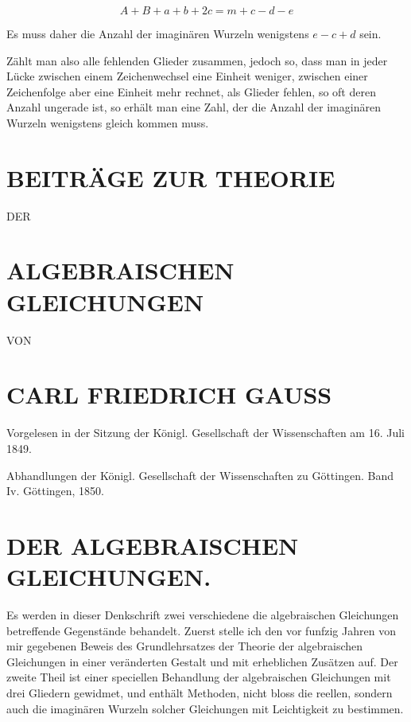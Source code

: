 \documentclass[twoside,12pt, showframe]{memoir}
\begin{document}
\[
A+B+a+b+2 c=m+c-d-e
\]

Es muss daher die Anzahl der imaginären Wurzeln wenigstens \(e-c+d\) sein.

Zählt man also alle fehlenden Glieder zusammen, jedoch so, dass man in jeder Lücke zwischen einem Zeichenwechsel eine Einheit weniger, zwischen einer Zeichenfolge aber eine Einheit mehr rechnet, als Glieder fehlen, so oft deren Anzahl ungerade ist, so erhält man eine Zahl, der die Anzahl der imaginären Wurzeln wenigstens gleich kommen muss.

\section*{BEITRÄGE ZUR THEORIE}
DER

\section*{ALGEBRAISCHEN GLEICHUNGEN}
VON

\section*{CARL FRIEDRICH GAUSS}
Vorgelesen in der Sitzung der Königl. Gesellschaft der Wissenschaften am 16. Juli 1849.

Abhandlungen der Königl. Gesellschaft der Wissenschaften zu Göttingen. Band Iv. Göttingen, 1850.

\section*{DER ALGEBRAISCHEN GLEICHUNGEN.}
Es werden in dieser Denkschrift zwei verschiedene die algebraischen Gleichungen betreffende Gegenstände behandelt. Zuerst stelle ich den vor funfzig Jahren von mir gegebenen Beweis des Grundlehrsatzes der Theorie der algebraischen Gleichungen in einer veränderten Gestalt und mit erheblichen Zusätzen auf. Der zweite Theil ist einer speciellen Behandlung der algebraischen Gleichungen mit drei Gliedern gewidmet, und enthält Methoden, nicht bloss die reellen, sondern auch die imaginären Wurzeln solcher Gleichungen mit Leichtigkeit zu bestimmen.
\end{document}
